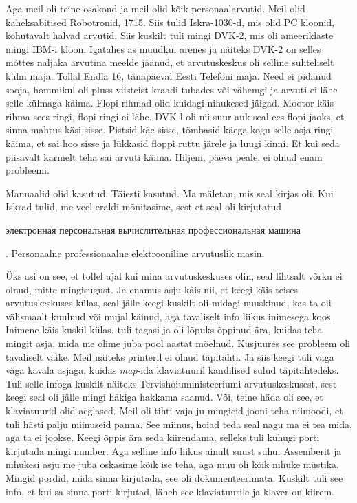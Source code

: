 Aga meil oli teine osakond ja meil olid kõik personaalarvutid. Meil olid kaheksabitised Robotronid, 1715. Siis tulid Iskra-1030-d, mis olid PC kloonid, kohutavalt halvad arvutid. Siis kuskilt tuli mingi DVK-2, mis oli ameeriklaste  mingi IBM-i kloon. Igatahes as muudkui arenes ja näiteks DVK-2 on selles mõttes naljaka arvutina meelde jäänud, et arvutuskeskus oli selline suhteliselt külm maja. Tollal Endla 16, tänapäeval Eesti Telefoni maja. Need ei pidanud sooja, hommikul oli pluss viisteist kraadi tubades või vähemgi ja arvuti ei lähe selle külmaga käima. Flopi rihmad olid kuidagi nihukesed jäigad. Mootor käis rihma sees ringi, flopi ringi ei lähe. DVK-l oli nii suur auk seal ees flopi jaoks, et sinna mahtus käsi sisse. Pistsid käe sisse, tõmbasid käega kogu selle asja ringi käima, et sai hoo sisse ja lükkasid floppi ruttu järele ja luugi kinni. Et kui seda piisavalt kärmelt teha sai arvuti käima. Hiljem, päeva peale, ei olnud enam probleemi. 


Manuaalid olid kasutud. Täiesti kasutud. Ma mäletan, mis seal kirjas oli. Kui Iskrad tulid, me  veel eraldi mõnitasime, sest et seal oli kirjutatud \begin{russian}электронная персональная вычислительная профессиональная машина\end{russian}. Personaalne professionaalne elektrooniline arvutuslik masin. 


Üks asi on see, et tollel ajal kui mina arvutuskeskuses olin, seal lihtsalt võrku ei olnud, mitte mingisugust. Ja enamus asju käis nii, et keegi käis teises arvutuskeskuses külas, seal jälle keegi kuskilt oli midagi nuuskinud, kas ta oli välismaalt kuulnud või mujal käinud, aga tavaliselt info liikus inimesega koos. Inimene käis kuskil külas,  tuli tagasi ja  oli lõpuks õppinud ära, kuidas teha mingit asja, mida me olime juba pool aastat mõelnud. Kusjuures see probleem oli tavaliselt väike. Meil näiteks printeril ei olnud täpitähti. Ja siis keegi tuli väga väga kavala asjaga, kuidas \emph{map}-ida  klaviatuuril kandilised sulud täpitähtedeks. Tuli selle infoga kuskilt näiteks Tervishoiuministeeriumi arvutuskeskusest, sest keegi seal oli jälle mingi häkiga hakkama saanud. Või, teine häda oli see, et klaviatuurid olid aeglased. Meil oli tihti vaja ju mingieid jooni teha niimoodi, et tuli hästi palju miinuseid panna. See miinus, hoiad teda seal nagu ma ei tea mida, aga ta ei jookse. Keegi õppis ära seda kiirendama, selleks tuli kuhugi porti kirjutada mingi number. Aga selline info liikus ainult suust suhu. Assemberit ja nihukesi asju me juba oskasime kõik ise teha, aga muu oli kõik nihuke müstika. Mingid pordid, mida sinna kirjutada, see oli dokumenteerimata. Kuskilt tuli see info, et kui sa sinna porti kirjutad, läheb see klaviatuurile ja klaver on kiirem. 

